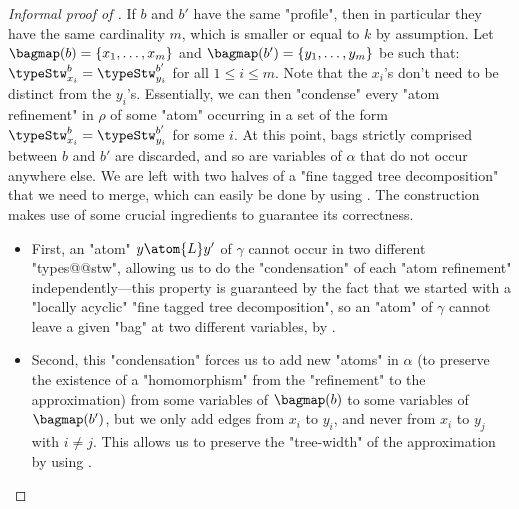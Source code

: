 \begin{proof}[Informal proof of ]
    \AP\label{proof-claim:shortening-paths}
    If $b$ and $b'$ have the same "profile", then in particular they have the same cardinality $m$,
    which is smaller or equal to $k$ by assumption.
    Let $\bagmap(b) = \{x_1,\dotsc, x_m\}$ and $\bagmap(b') = \{y_1,\dotsc,y_m\}$ be such that: 
    $\typeStw^{b}_{x_i} = \typeStw^{b'}_{y_i}$ for all $1 \leq i \leq m$.
	Note that the $x_i$'s don't need to be distinct from the $y_i$'s.
	Essentially, we can then "condense"
    every "atom refinement" in $\rho$ of some "atom" occurring in a set
    of the form $\typeStw^{b}_{x_i} = \typeStw^{b'}_{y_i}$ for some $i$.
	At this point, bags strictly comprised between
    $b$ and $b'$ are discarded, and so are variables of $\alpha$ that do not occur anywhere else.
    We are left with two halves of a "fine tagged tree decomposition" that we need to merge,
    which can easily be done by using .
    The construction makes use of some crucial ingredients to guarantee its correctness.
    \begin{itemize}
        \item First, an "atom" $y \atom{L} y'$ of $\gamma$ cannot occur
            in two different "types@@stw", allowing us to do the "condensation" of each "atom refinement" independently---this property is guaranteed by the fact that we started
			with a "locally acyclic" "fine tagged tree decomposition", so an "atom" of $\gamma$ cannot leave a given "bag" at two different variables, by
			.
        \item Second, this "condensation" forces us to add new "atoms" in $\alpha$ (to preserve the
            existence of a "homomorphism" from the "refinement" to the approximation)
            from some variables of $\bagmap(b)$ to some variables of $\bagmap(b')$,
            but we only add edges from $x_i$ to $y_i$, and never from $x_i$ to $y_j$ with
			$i \neq j$. This allows us to preserve the "tree-width" of the approximation
			by using .\qedhere
    \end{itemize}
\end{proof}

